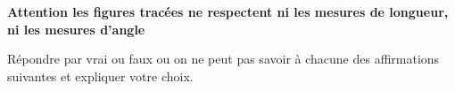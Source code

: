 \documentclass[10pt]{article}
\begin{document}
\setlength\parindent{0mm}
\pagestyle{fancy}
\thispagestyle{empty}
    
    
    




\medskip

\textbf{Attention les figures tracées ne respectent ni les mesures de longueur, ni les mesures d'angle} 

\medskip
 
Répondre par \og vrai \fg{} ou \og faux \fg{} ou \og on ne peut pas savoir \fg{} à chacune des affirmations suivantes et expliquer votre choix.
\end{document}
